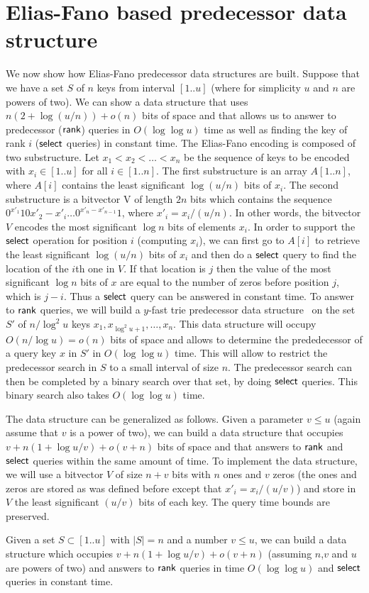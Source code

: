 \documentclass[11pt,runningheads]{llncs}
\def\rank{\mbox{\rm {\sf rank}}}
\def\select{\mbox{\rm {\sf select}}}
\begin{document}
\section{Elias-Fano based predecessor data structure}
\label{sec:Elias_Fano_pred}
We now show how Elias-Fano predecessor data structures are built. 
Suppose that we have a set $S$ of $n$ keys from interval $[1..u]$
(where for simplicity $u$ and $n$ are powers of two). We can 
show a data structure that uses $n(2+\log(u/n))+o(n)$ bits of space 
and that allows us to answer to predecessor ($\rank$) queries
in $O(\log \log u)$ time as well as finding the key of rank $i$ ($\select$ queries) 
in constant time. The Elias-Fano encoding is composed of 
two substructure. Let $x_1<x_2<\ldots <x_n$ be the sequence 
of keys to be encoded with $x_i\in [1..u]$ for all $i\in[1..n]$. The first substructure is an array 
$A[1..n]$, where $A[i]$ contains the least significant 
$\log(u/n)$ bits of $x_i$. The second substructure is a bitvector
V of length $2n$ bits which contains the sequence $0^{x'_1}10{x'_2-x'_i}\ldots 0^{x'_n-x'_{n-1}}1$, 
where $x'_i=x_i/(u/n)$. In other words, the bitvector $V$ encodes the most significant $\log n$ bits 
of elements $x_i$. In order to support the $\select$ operation for position $i$
(computing $x_i$), we can first go to $A[i]$ to retrieve the least significant $\log(u/n)$
bits of $x_i$ and then do a $\select$ query to find the location of the $i$th one 
in $V$. If that location is $j$ then the value of the most significant $\log n$ bits 
of $x$ are equal to the number of zeros before position $j$, which is 
$j-i$. Thus a $\select$ query can be answered in constant time. 
To answer to $\rank$ queries, we will build a $y$-fast trie 
predecessor data structure~\cite{Wi83} on the set $S'$ of $n/\log^2 u$ 
keys $x_1,x_{\log^2u+1},\ldots,x_{n}$. 
This data structure will occupy $O(n/\log u)=o(n)$ bits of space and allows 
to determine the prededecessor of a query key $x$ in $S'$ in $O(\log\log u)$ time. 
This will allow to restrict the predecessor search in $S$ to a small interval 
of size $n$. The predecessor search can then be completed by a binary search 
over that set, by doing $\select$ queries. This binary search also takes 
$O(\log\log u)$ time. 

The data structure can be generalized as follows. 
Given a parameter $v\leq u$ (again assume that $v$ is a power of two), 
we can build a data structure that occupies $v+n(1+\log u/v)+o(v+n)$ bits 
of space and that answers to $\rank$ and $\select$ 
queries within the same amount of time. To implement the data structure, 
we will use a bitvector $V$ of size $n+v$ bits with $n$ ones 
and $v$ zeros (the ones and zeros are stored as was defined before
except that $x'_i=x_i/(u/v)$) and store in $V$ the 
least significant $(u/v)$ bits of each key. The query time bounds
are preserved. 
\begin{lemma}
Given a set $S\subset [1..u]$ with $|S|=n$ and a number $v\leq u$, 
we can build a data structure which occupies
$v+n(1+\log u/v)+o(v+n)$ (assuming $n$,$v$ and $u$ are powers of 
two) and answers to $\rank$ queries in time $O(\log\log u)$ 
and $\select$ queries in constant time. 
\end{lemma}
\end{document}
